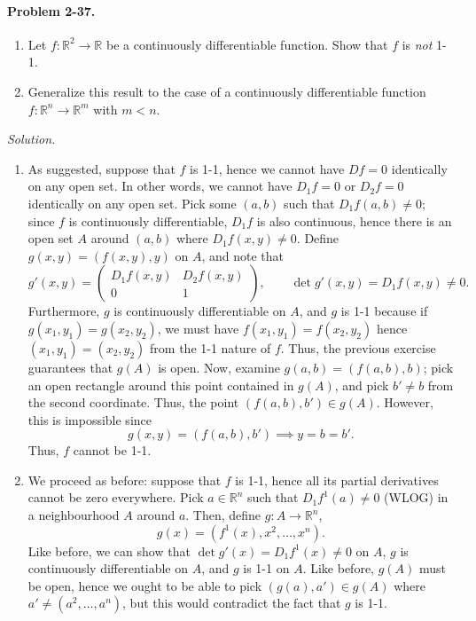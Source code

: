 \documentclass[11pt]{report}
\newcommand{\R}{\mathbb{R}}
\newcommand{\problem}[1]{\paragraph{Problem #1.}}
\newcommand{\solution}{\noindent\textit{Solution.} }
\begin{document}
    \problem{2-37} \begin{enumerate}
        \item Let $f\colon \R^2 \to \R$ be a continuously differentiable function.
        Show that $f$ is \emph{not} 1-1.

        \item Generalize this result to the case of a continuously differentiable
        function $f\colon \R^n \to \R^m$ with $m < n$.
    \end{enumerate}

    \solution \begin{enumerate}
        \item As suggested, suppose that $f$ is 1-1, hence we cannot have $Df = 0$
        identically on any open set. In other words, we cannot have $D_1f = 0$ or
        $D_2f = 0$ identically on any open set. Pick some $(a, b)$ such that $D_1f(a,
        b) \neq 0$; since $f$ is continuously differentiable, $D_1f$ is also
        continuous, hence there is an open set $A$ around $(a, b)$ where $D_1f(x, y)
        \neq 0$. Define $g(x, y) = (f(x, y), y)$ on $A$, and note that \[
            g'(x, y) = \begin{pmatrix}
                D_1f(x, y) & D_2f(x, y) \\ 0 & 1
            \end{pmatrix}, \qquad
            \det{g'(x, y)} = D_1f(x, y) \neq 0.
        \] Furthermore, $g$ is continuously differentiable on $A$, and $g$ is 1-1
        because if $g(x_1, y_1) = g(x_2, y_2)$, we must have $f(x_1, y_1) = f(x_2,
        y_2)$ hence $(x_1, y_1) = (x_2, y_2)$ from the 1-1 nature of $f$. Thus, the
        previous exercise guarantees that $g(A)$ is open. Now, examine $g(a, b) =
        (f(a, b), b)$; pick an open rectangle around this point contained in $g(A)$,
        and pick $b' \neq b$ from the second coordinate. Thus, the point $(f(a, b),
        b') \in g(A)$. However, this is impossible since \[
            g(x, y) = (f(a, b), b') \implies y = b = b'.
        \] Thus, $f$ cannot be 1-1.

        \item We proceed as before: suppose that $f$ is 1-1, hence all its partial
        derivatives cannot be zero everywhere. Pick $a \in \R^n$ such that $D_1f^1(a)
        \neq 0$ (WLOG) in a neighbourhood $A$ around $a$. Then, define $g\colon A \to
        \R^n$, \[
            g(x) = (f^1(x), x^2, \dots, x^n).
        \] Like before, we can show that $\det{g'(x)} = D_1f^1(x) \neq 0$ on $A$, $g$
        is continuously differentiable on $A$, and $g$ is 1-1 on $A$. Like before,
        $g(A)$ must be open, hence we ought to be able to pick $(g(a), a') \in g(A)$
        where $a' \neq (a^2, \dots, a^n)$, but this would contradict the fact that
        $g$ is 1-1.
    \end{enumerate}
\end{document}
